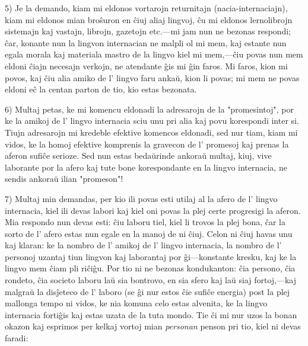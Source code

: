 \documentclass[12pt,twoside]{book}
\begin{document}
5) Je la demando, kiam mi eldonos vortarojn returnitajn (nacia-internaciajn), kiam mi eldonos mian broŝuron en ĉiuj aliaj lingvoj, ĉu mi eldonos lernolibrojn sistemajn kaj vastajn, librojn, gazetojn etc.—mi jam nun ne bezonas respondi; ĉar, konante nun la lingvon internacian ne malpli ol mi mem, kaj estante nun egala morala kaj materiala mastro de la lingvo kiel mi mem,—ĉiu povas nun mem eldoni ĉiajn necesajn verkojn, ne atendante ĝis mi ĝin faros. Mi faros, kion mi povos, kaj ĉiu alia amiko de l' lingvo faru ankaŭ, kion li povas; mi mem ne povas eldoni eĉ la centan parton de tio, kio estas bezonata.

6) Multaj petas, ke mi komencu eldonadi la adresarojn de la "promesintoj", por ke la amikoj de l' lingvo internacia sciu unu pri alia kaj povu korespondi inter si. Tiujn adresarojn mi kredeble efektive komencos eldonadi, sed nur tiam, kiam mi vidos, ke la homoj efektive komprenis la gravecon de l' promesoj kaj prenas la aferon sufiĉe serioze. Sed nun estas bedaŭrinde ankoraŭ multaj, kiuj, vive laborante por la afero kaj tute bone korespondante en la lingvo internacia, ne sendis ankoraŭ ilian "promeson"!

7) Multaj min demandas, per kio ili povas esti utilaj al la afero de l' lingvo internacia, kiel ili devas labori kaj kiel oni povas la plej certe progresigi la aferon. Mia respondo nun devas esti: ĉiu laboru tiel, kiel li trovos la plej bona, ĉar la sorto de l' afero estas nun egale en la manoj de ni ĉiuj. Celon ni ĉiuj havas unu kaj klaran: ke la nombro de l' amikoj de l' lingvo internacia, la nombro de l' personoj uzantaj tiun lingvon kaj laborantaj por ĝi—konstante kresku, kaj ke la lingvo mem ĉiam pli riĉiĝu. Por tio ni ne bezonas kondukanton: ĉia persono, ĉia rondeto, ĉia societo laboru laŭ sia bontrovo, en sia sfero kaj laŭ siaj fortoj,—kaj malgraŭ la disĵeteco de l' laboro (se ĝi nur estos ĉie sufiĉe energia) post la plej mallonga tempo ni vidos, ke nia komuna celo estas alvenita, ke la lingvo internacia fortiĝis kaj estas uzata de la tuta mondo. Tie ĉi mi nur uzos la bonan okazon kaj esprimos per kelkaj vortoj mian \emph{personan} penson pri tio, kiel ni devas faradi:
\end{document}
